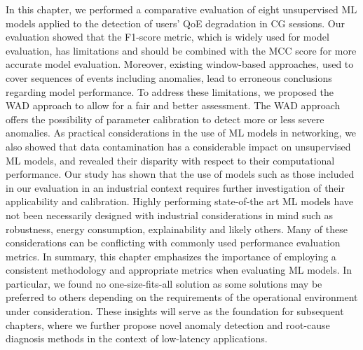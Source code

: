 
In this chapter, we performed a comparative evaluation of eight unsupervised ML models applied to the detection of users' QoE degradation in CG sessions. Our evaluation showed that the F1-score metric, which is widely used for model evaluation, has limitations and should be combined with the MCC score for more accurate model evaluation. Moreover, existing window-based approaches, used to cover sequences of events including anomalies, lead to erroneous conclusions regarding model performance. To address these limitations, we proposed the WAD approach to allow for a fair and better assessment. The WAD approach offers the possibility of parameter calibration to detect more or less severe anomalies. As practical considerations in the use of ML models in networking, we also showed that data contamination has a considerable impact on unsupervised ML models, and revealed their disparity with respect to their computational performance. Our study has shown that the use of models such as those included in our evaluation in an industrial context requires further investigation of their applicability and calibration. Highly performing state-of-the art ML models have not been necessarily designed with industrial considerations in mind such as robustness, energy consumption, explainability and likely others. Many of these considerations can be conflicting with commonly used performance evaluation metrics. 
In summary, this chapter emphasizes the importance of employing a consistent methodology and appropriate metrics when evaluating ML models. In particular, we found no one-size-fits-all solution as some solutions may be preferred to others depending on the requirements of the operational environment under consideration. These insights will serve as the foundation for subsequent chapters, where we further propose novel anomaly detection and root-cause diagnosis methods in the context of low-latency applications.



